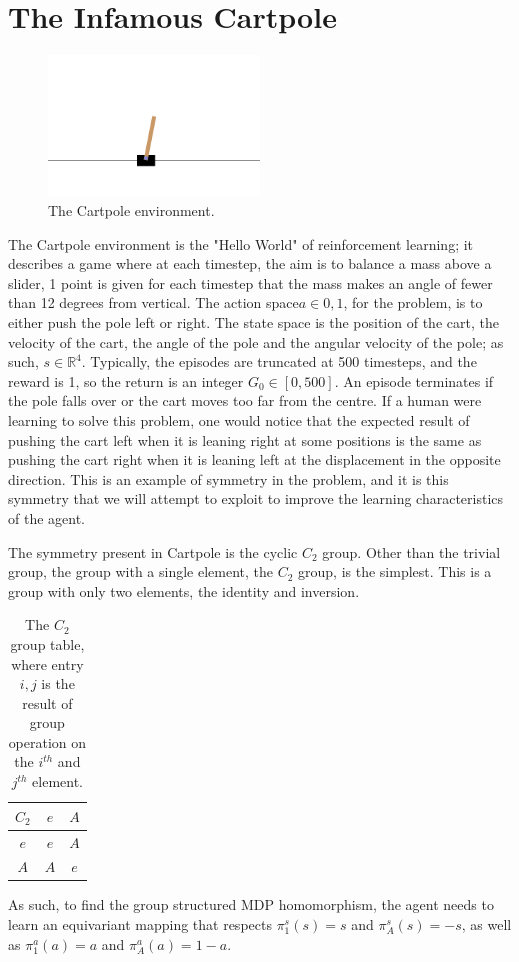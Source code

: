 \section{The Infamous Cartpole}
\begin{figure}[h!]
	\centering
	\includegraphics[width=0.5\textwidth]{Figures/cart_pole.png}
	\caption{The Cartpole environment.}
\end{figure}
The Cartpole environment is the "Hello World" of reinforcement learning; it describes a game where at each timestep, the aim is to balance a mass above a slider, 1 point is given for each timestep that the mass makes an angle of fewer than 12 degrees from vertical. The action space$a \in {0,1}$, for the problem, is to either push the pole left or right. The state space is the position of the cart, the velocity of the cart, the angle of the pole and the angular velocity of the pole; as such, $s \in \mathbb{R}^4$. Typically, the episodes are truncated at 500 timesteps, and the reward is 1, so the return is an integer $G_0 \in [0, 500]$. An episode terminates if the pole falls over or the cart moves too far from the centre. If a human were learning to solve this problem, one would notice that the expected result of pushing the cart left when it is leaning right at some positions is the same as pushing the cart right when it is leaning left at the displacement in the opposite direction. This is an example of symmetry in the problem, and it is this symmetry that we will attempt to exploit to improve the learning characteristics of the agent.

The symmetry present in Cartpole is the cyclic $C_2$ group. Other than the trivial group, the group with a single element, the $C_2$ group, is the simplest. This is a group with only two elements, the identity and inversion.
\begin{table}[h!]
	\centering
	\begin{tabular}{c | c  c}
		$C_2$ & $e$ & $A$ \\
		\hline
		$e$   & $e$ & $A$ \\
		$A$   & $A$ & $e$
	\end{tabular}
	\caption{The $C_2$ group table, where entry $i, j$ is the result of group operation on the $i^{th}$ and $j^{th}$ element.}
\end{table}


As such, to find the group structured MDP homomorphism, the agent needs to learn an equivariant mapping that respects $\pi_1^s(s) = s$ and $\pi_A^s(s) = -s$, as well as $\pi_1^a(a) = a$ and $\pi_A^a(a) = 1 - a$.

